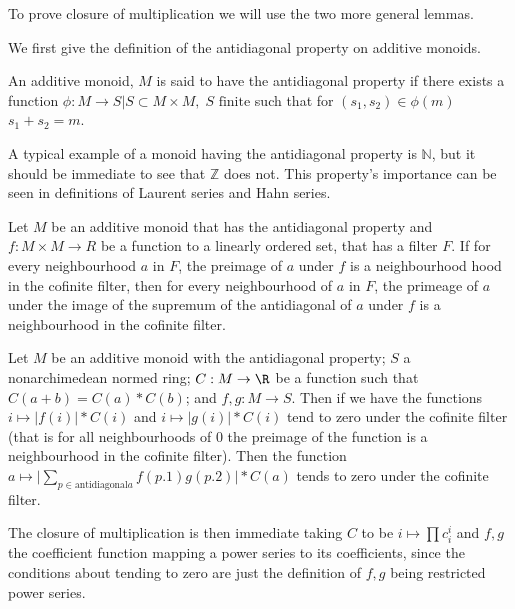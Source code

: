 To prove closure of multiplication we will use the two more general lemmas.

We first give the definition of the antidiagonal property on additive monoids.

\begin{definition} %
  An additive monoid, $M$ is said to have the antidiagonal property if there exists a function
  $ \phi : M \to {S | S \subset M \times M, \; S \text{ finite}}$ such that for $(s_1, s_2) \in \phi (m)$
  $s_1 + s_2 = m$.
\end{definition}

A typical example of a monoid having the antidiagonal property is $\mathbb{N}$, but it should be
immediate to see that $\mathbb{Z}$ does not. This property's importance can be seen in definitions
of Laurent series and Hahn series. %


\begin{lemma}
  Let $M$ be an additive monoid that has the antidiagonal property and $f : M \times M \to R$ be
  a function to a linearly ordered set, that has a filter $F$. If for every neighbourhood
  $a$ in $F$, the preimage of $a$ under $f$ is a neighbourhood hood in the cofinite filter,
  then for every neighbourhood of $a$ in $F$, the primeage of $a$ under the image of the supremum of the
  antidiagonal of $a$ under $f$ is a neighbourhood in the cofinite filter.
\end{lemma}

\begin{lemma}
  Let $M$ be an additive monoid with the antidiagonal property; $S$ a nonarchimedean normed
  ring; $C : M \to \R$ be a function such that $C (a + b) = C (a) * C (b)$; and $f, g : M \to S$.
  Then if we have the functions $i \mapsto \lvert f(i)  \rvert * C(i)$ and
  $i \mapsto \lvert g(i) \rvert * C(i)$ tend to zero under the cofinite filter (that is for all
  neighbourhoods of 0 the preimage of the function is a neighbourhood in the cofinite filter). Then
  the function $a \mapsto \lvert \sum_{p \in \text{antidiagonal} a} f (p.1) g (p.2) \rvert * C (a)$
  tends to zero under the cofinite filter.
\end{lemma}

The closure of multiplication is then immediate taking $C$ to be $i \mapsto \prod c_i^i$ and $f, g$
the coefficient function mapping a power series to its coefficients, since the conditions about tending
to zero are just the definition of $f,g$ being restricted power series.


